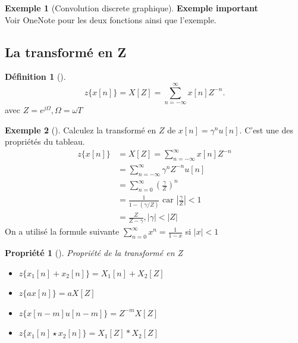 \documentclass{article}
\theoremstyle{plain}%
\newtheorem{prop}[thm]{Propriété}
\theoremstyle{definition}
\newtheorem{defn}{Définition}[section]
\newtheorem{exmp}{Exemple}[section]
\theoremstyle{remark}
\begin{document}
\begin{exmp}[Convolution discrete graphique]
    \textbf{Exemple important} \\
    Voir OneNote pour les deux fonctions ainsi que l'exemple.
\end{exmp}

\subsection{La transformé en Z}
\begin{defn}[]
    
    \[
        z\{x[n]\} = X[Z] = \sum_{n=-\infty }^{\infty }x[n]Z^{-n}
    .\]
    avec $ Z = e^{j \Omega }, \Omega = \omega T $ 
\end{defn}

\begin{exmp}[]
    Calculez la transformé en $ Z $ de $ x[n] = \gamma^n u[n] $. C'est une des propriétés du tableau.
    \begin{align*}
        z\{x[n]\} &= X[Z] = \sum_{n=-\infty }^{\infty }x[n]Z^{-n} \\
            &= \sum_{n=-\infty }^{\infty } \gamma ^n Z^{-n} u[n] \\
            &= \sum_{n=0}^{\infty }(\frac{\gamma }{Z})^n \\
            &= \frac{1}{1- (\gamma /Z)} \text{ car } \left| \frac{\gamma }{Z} \right| < 1 \\
            &= \frac{Z}{Z - \gamma }, \left| \gamma  \right| < \left| Z \right| 
    \end{align*} 
    On a utilisé la formule suivante $ \sum_{n=0}^{\infty }x^n = \frac{1}{1-x} $ si $ \left| x \right| < 1 $ 
\end{exmp}
\begin{prop}[]
    Propriété de la transformé en Z \begin{itemize}
        \item $ z\{ x_1[n] + x_2[n] \} = X_1[n] + X_2[Z]$ 
        \item $ z\{ a x[n]\} = a X[Z]$ 
        \item $ z\{ x[n-m] u[n-m]\} = Z^{-m} X[Z]$ 
        \item $ z\{ x_1[n] \star x_2[n]\} = X_1[Z] * X_2[Z]$ 
    \end{itemize}
\end{prop}
\end{document}
